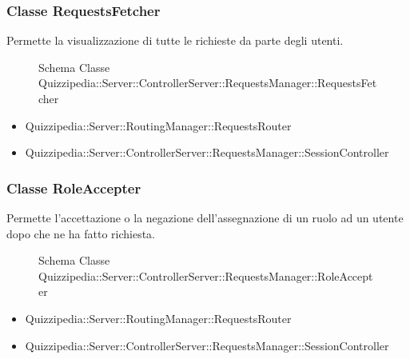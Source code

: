 \subsubsection{Classe RequestsFetcher}
Permette la visualizzazione di tutte le richieste da parte degli utenti.
\begin{figure}[H]
\centering
\noindent{}
\caption{Schema Classe Quizzipedia::Server::ControllerServer::RequestsManager::RequestsFetcher}
\end{figure}
\begin{itemize}
\item Quizzipedia::Server::RoutingManager::RequestsRouter
\end{itemize}
\begin{itemize}
\item Quizzipedia::Server::ControllerServer::RequestsManager::SessionController
\end{itemize}
\subsubsection{Classe RoleAccepter}
Permette l'accettazione o la negazione dell'assegnazione di un ruolo ad un utente dopo che ne ha fatto richiesta.
\begin{figure}[H]
\centering
\noindent{}
\caption{Schema Classe Quizzipedia::Server::ControllerServer::RequestsManager::RoleAccepter}
\end{figure}
\begin{itemize}
\item Quizzipedia::Server::RoutingManager::RequestsRouter
\end{itemize}
\begin{itemize}
\item Quizzipedia::Server::ControllerServer::RequestsManager::SessionController
\end{itemize}

